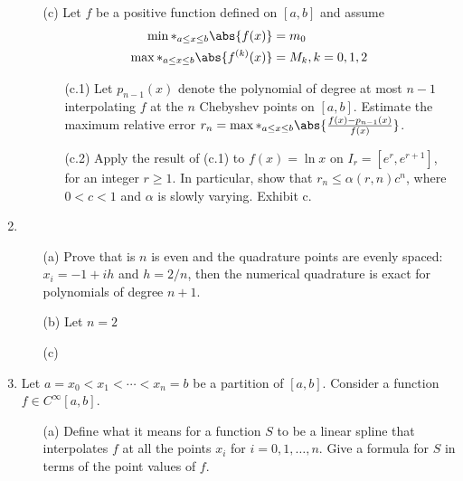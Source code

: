 \documentclass[11pt]{article}
\begin{document}
\begin{enumerate}
\begin{enumerate}
            \item[(c)]
                Let $f$ be a positive function defined on $[a, b]$ and assume
                \begin{align*}
                    \min*_{a \le x \le b} \abs{f(x)} &= m_0 \\
                    \max*_{a \le x \le b} \abs{f^{(k)}(x)} &= M_k, k = 0, 1, 2
                \end{align*}
                \begin{enumerate}
                    \item[(c.1)]
                        Let $p_{n-1}(x)$ denote the polynomial of degree at most
                        $n - 1$ interpolating $f$ at the $n$ Chebyshev points on
                        $[a, b]$.
                        Estimate the maximum relative error
                        $r_n = \max*_{a \le x \le b} \abs{\frac{f(x) - p_{n-1}(x)}{f(x)}}$.

                    \item[(c.2)]
                        Apply the result of (c.1) to $f(x) = \ln{x}$ on
                        $I_r = [e^r, e^{r+1}]$, for an integer $r \ge 1$.
                        In particular, show that $r_n \le \alpha(r, n) c^n$,
                        where $0 < c < 1$ and $\alpha$ is slowly varying.
                        Exhibit c.
                \end{enumerate}
        \end{enumerate}

    \item %
        \begin{enumerate}
            \item[(a)]
                Prove that is $n$ is even and the quadrature points are evenly
                spaced: $x_i = -1 + ih$ and $h = 2/n$, then the numerical
                quadrature is exact for polynomials of degree $n + 1$.

            \item[(b)]
                Let $n = 2$
            \item[(c)]
        \end{enumerate}

    \item %
        Let $a = x_0 < x_1 < \cdots < x_n = b$ be a partition of $[a, b]$.
        Consider a function $f \in C^{\infty}[a, b]$.
        \begin{enumerate}
            \item[(a)] %
                Define what it means for a function $S$ to be a linear spline
                that interpolates $f$ at all the points $x_i$ for
                $i = 0, 1, \ldots, n$.
                Give a formula for $S$ in terms of the point values of $f$.


\end{enumerate}
\end{enumerate}
\end{document}
